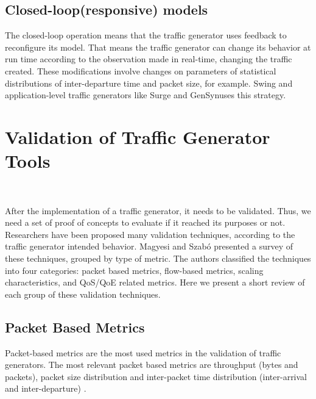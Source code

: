 \subsection{Closed-loop(responsive) models}

The closed-loop operation means that the traffic generator uses feedback to reconfigure its model. That means the traffic generator can change its behavior at run time according to the observation made in real-time, changing the traffic created. These modifications involve changes on parameters of statistical distributions of inter-departure time and packet size, for example. Swing\cite{swing-paper} and application-level traffic generators like Surge\cite{surge-paper} and GenSyn\cite{gensyn-paper}uses this strategy.





\section{Validation of Traffic Generator Tools}~\label{sec:validation-traffic-gen}


After the implementation of a traffic generator, it needs to be validated. Thus, we need a set of proof of concepts to evaluate if it reached its purposes or not. Researchers have been proposed many validation techniques, according to the traffic generator intended behavior. Magyesi and Szabó\cite{validate-trafficgen} presented a survey of these techniques, grouped by type of metric. The authors classified the techniques into four categories: packet based metrics, flow-based metrics, scaling characteristics, and \acrshort{QoS}/\acrshort{QoE} related metrics. Here we present a short review of each group of these validation techniques.


\subsection{Packet Based Metrics}

Packet-based metrics are the most used metrics in the validation of traffic generators\cite{validate-trafficgen}. The most relevant packet based metrics are throughput\cite{do-you-trust}\cite{comparative-trafficgen-tools}\cite{performance-trafficgen}\cite{moongen-paper} (bytes and packets), packet size distribution\cite{packet-distribution-model} and inter-packet time distribution (inter-arrival and inter-departure)\cite{sourcesonoff-paper} \cite{ditg-paper}.


